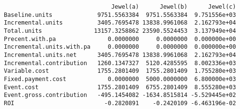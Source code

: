 \documentclass[]{article}
\newenvironment{Shaded}{\begin{snugshade}}{\end{snugshade}}
\newcommand{\CommentTok}[1]{\textcolor[rgb]{0.56,0.35,0.01}{\textit{#1}}}
\newcommand{\DataTypeTok}[1]{\textcolor[rgb]{0.13,0.29,0.53}{#1}}
\newcommand{\DecValTok}[1]{\textcolor[rgb]{0.00,0.00,0.81}{#1}}
\newcommand{\FloatTok}[1]{\textcolor[rgb]{0.00,0.00,0.81}{#1}}
\newcommand{\KeywordTok}[1]{\textcolor[rgb]{0.13,0.29,0.53}{\textbf{#1}}}
\newcommand{\NormalTok}[1]{#1}
\newcommand{\StringTok}[1]{\textcolor[rgb]{0.31,0.60,0.02}{#1}}
\begin{document}
\begin{verbatim}
                               Jewel(a)      Jewel(b)      Jewel(c)
Baseline.units             9751.5563384  9751.5563384  9.751556e+03
Incremental.units          3405.7695478 13838.9961068  2.162793e+04
Total.units               13157.3258862 23590.5524453  3.137949e+04
Precent.with.pa               0.0000000     0.0000000  0.000000e+00
Incremental.units.with.pa     0.0000000     0.0000000  0.000000e+00
Incremental.units.net      3405.7695478 13838.9961068  2.162793e+04
Incremental.contribution   1260.1347327  5120.4285595  8.002336e+03
Variable.cost              1755.2801409  1755.2801409  1.755280e+03
Fixed.payment.cost            0.0000000  5000.0000000  6.800000e+03
Event.cost                 1755.2801409  6755.2801409  8.555280e+03
Event.gross.contribution   -495.1454082 -1634.8515814 -5.529445e+02
ROI                          -0.2820891    -0.2420109 -6.463196e-02
\end{verbatim}

\begin{Shaded}
\end{Shaded}
\end{document}
